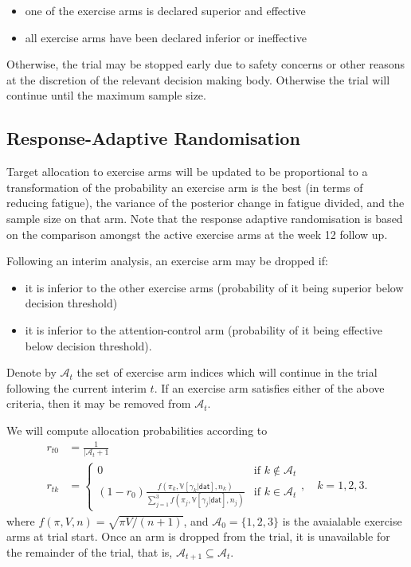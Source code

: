 \documentclass[
]{article}
\providecommand{\tightlist}{%
  \setlength{\itemsep}{0pt}\setlength{\parskip}{0pt}}
\begin{document}
\begin{itemize}\tightlist
  \item one of the exercise arms is declared superior and effective
  \item all exercise arms have been declared inferior or ineffective
\end{itemize}

Otherwise, the trial may be stopped early due to safety concerns or other reasons at the discretion of the relevant decision making body.
Otherwise the trial will continue until the maximum sample size.

\hypertarget{response-adaptive-randomisation}{%
  \subsection{Response-Adaptive Randomisation}\label{response-adaptive-randomisation}}

Target allocation to exercise arms will be updated to be proportional to a transformation of the probability an exercise arm is the best (in terms of reducing fatigue), the variance of the posterior change in fatigue divided, and the sample size on that arm.
Note that the response adaptive randomisation is based on the comparison amongst the active exercise arms at the week 12 follow up.

Following an interim analysis, an exercise arm may be dropped if:
\begin{itemize}\tightlist
  \item it is inferior to the other exercise arms (probability of it being superior below decision threshold)
  \item it is inferior to the attention-control arm (probability of it being effective below decision threshold).
\end{itemize}

Denote by $\mathcal{A}_t$ the set of exercise arm indices which will continue in the trial following the current interim $t$.
If an exercise arm satisfies either of the above criteria, then it may be removed from $\mathcal{A}_t$.

We will compute allocation probabilities according to
$$
\begin{aligned}
r_{t0} &= \frac{1}{|\mathcal{A}_t + 1} \\
r_{tk} &= \begin{cases}
  0 & \text{if } k \notin \mathcal{A}_t \\
  (1 - r_0) \frac{f(\pi_k, \mathbb V[\gamma_k|\mathsf{dat}], n_k)}{\sum_{j=1}^3 f(\pi_j, \mathbb V[\gamma_j|\mathsf{dat}], n_j)} & \text{if }k\in\mathcal{A}_t
\end{cases}, \quad k=1,2,3.
\end{aligned}
$$
where $f(\pi, V, n) = \sqrt{\pi V/(n + 1)}$, and $\mathcal{A}_0 = \{1,2,3\}$ is the avaialable exercise arms at trial start.
Once an arm is dropped from the trial, it is unavailable for the remainder of the trial, that is, $\mathcal{A}_{t+1} \subseteq \mathcal{A}_t$.
\end{document}
